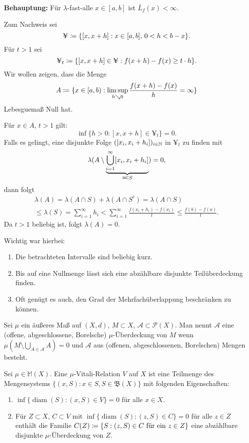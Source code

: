 \documentclass[a4paper,twoside,DIV15,BCOR12mm]{scrbook}
\newcommand{\A}{\mathcal A}
\newcommand{\borel}{\mathfrak B}
\DeclareMathOperator{\diam}{diam}
\newcommand{\downto}{\mathrel\searrow}
\begin{document}
\textbf{Behauptung:} Für $\lambda$-fast-alle $x\in[a,b]$ ist $\bar L_f(x)<\infty$.

Zum Nachweis sei
\[
\yen  \da \{[x,x+h]: x\in[a,b],\, 0<h<b-x\}.
\]
Für $t>1$ sei
\[
\yen_t \da \{[x,x+h] \in \yen: f(x+h) - f(x) \ge t\cdot h\}.
\]
Wir wollen zeigen, dass die Menge
\[
A\da \{x\in [a,b): \limsup_{h\downto0} \frac{f(x+h)-f(x)}h = \infty\}
\]
Lebesguemaß Null hat.

Für $x\in A$, $t>1$ gilt:
\[
\inf\{h>0: [x,x+h ] \in \yen_t\} = 0.
\]
Falls es gelingt, eine disjunkte Folge $([x_i, x_i+h_i])_{i\in\mathbb{N}}$ in $\yen_t$ zu finden mit
\[
\lambda( A \setminus  \underbrace{\bigcup_{i=1}^\infty [x_i, x_i+h_i]}_{\ad S}) = 0,
\]
dann folgt
\begin{multline*}
\lambda(A) = \lambda(A\cap S) + \lambda(A\cap S^c) = \lambda(A\cap S)\\
\le \lambda(S) = \sum_{i=1}^\infty h_i < \sum_{i=1}^\infty \frac{f(x_i+h_i)- f(x_i)}t \le \frac{f(b)-f(a)}t.
\end{multline*}
Da $t>1$ beliebig ist, folgt $\lambda(A) = 0$.

Wichtig war hierbei:
\begin{enumerate}
\item Die betrachteten Intervalle sind beliebig kurz.
\item Bis auf eine Nullmenge lässt sich eine abzählbare disjunkte Teilüberdeckung finden.
\item Oft genügt es auch, den Grad der Mehrfachüberlappung beschränken zu können.
\end{enumerate}

\begin{definition}
Sei $\mu$ ein äußeres Maß auf $(X,d)$, $M\subset X$, $\A\subset \mathcal P(X)$. Man nennt $\A$ eine (offene, abgeschlossene, Borelsche) $\mu$-Überdeckung von $M$ wenn $\mu(M\setminus \bigcup_{A\in\A} A) = 0$ und $\A$ aus (offenen, abgeschlossenen, Borelschen) Mengen besteht.
\end{definition}

\begin{definition}
Sei $\mu\in \mathbb M(X)$. Eine $\mu$-Vitali-Relation $V$ auf $X$ ist eine Teilmenge des Mengensystems $\{(x,S): x\in S, S\in \borel(X)\}$ mit folgenden Eigenschaften:
\begin{enumerate}
\item $\inf\{\diam(S): (x,S)\in V\}=0$ für alle $x\in X$.
\item Für $Z\subset X$, $C\subset V$ mit $\inf\{\diam(S): (z,S)\in C\}=0$ für alle $z\in Z$ enthält die Familie $C(Z) \da \{S: (z,S)\in C \text{ für ein $z\in Z$}\}$ eine abzählbare disjunkte $\mu$-Überdeckung von $Z$.
\end{enumerate}
\end{definition}
\end{document}
